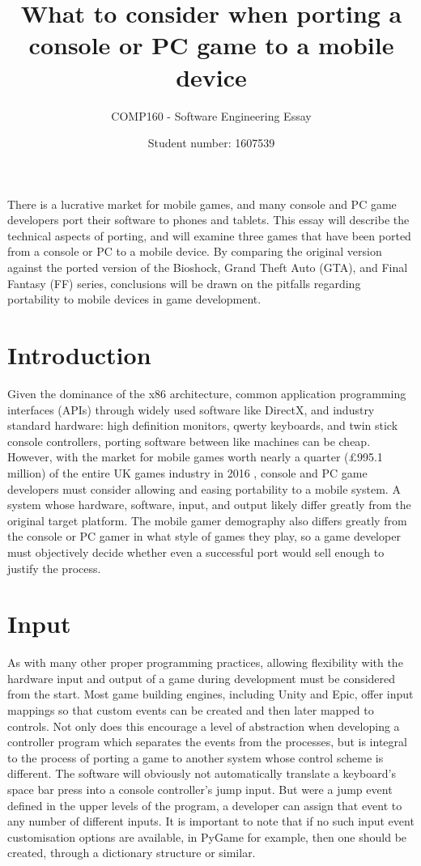 \documentclass{scrartcl}
\title
{
What to consider when porting a console or PC game to a mobile device
}
\subtitle{COMP160 - Software Engineering Essay}
\author{Student number: 1607539}
\begin{document}
\maketitle

\abstract
{
There is a lucrative market for mobile games, and many console and PC game developers port their software to phones and tablets.  This essay will describe the technical aspects of porting, and will examine three games that have been ported from a console or PC to a mobile device.  By comparing the original version against the ported version of the Bioshock, Grand Theft Auto (GTA), and Final Fantasy (FF) series, conclusions will be drawn on the pitfalls regarding portability to mobile devices in game development.

\section*{Introduction}

Given the dominance of the x86 architecture, common application programming interfaces (APIs) through widely used software like DirectX, and industry standard hardware: high definition monitors, qwerty keyboards, and twin stick console controllers, porting software between like machines can be cheap. However, with the market for mobile games worth nearly a quarter (\pounds995.1 million) of the entire UK games industry in 2016 \cite {UKIE2017}, console and PC game developers must consider allowing and easing portability to a mobile system. A system whose hardware, software, input, and output likely differ greatly from the original target platform.  The mobile gamer demography also differs greatly from the console or PC gamer in what style of games they play, so a game developer must objectively decide whether even a successful port would sell enough to justify the process.

\section*{Input}

As with many other proper programming practices, allowing flexibility with the hardware input and output of a game during development must be considered from the start.  Most game building engines, including Unity and Epic, offer input mappings so that custom events can be created and then later mapped to controls.  Not only does this encourage a level of abstraction when developing a controller program which separates the events from the processes, but is integral to the process of porting a game to another system whose control scheme is different. The software will obviously not automatically translate a keyboard's space bar press into a console controller's jump input. But were a jump event defined in the upper levels of the program, a developer can assign that event to any number of different inputs. It is important to note that if no such input event customisation options are available, in PyGame for example, then one should be created, through a dictionary structure or similar.

}
\end{document}
